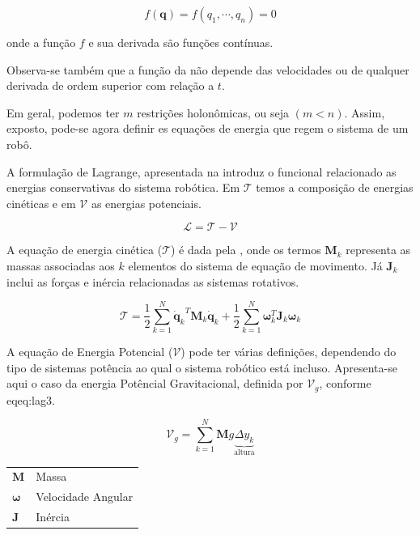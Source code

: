  \begin{equation}
     f(\mathbf{q}) = f(q_1, \cdots, q_n) = 0
     \label{eq:homo}
 \end{equation}

 onde a função $f$ e sua derivada são funções contínuas.

 Observa-se também que a função da  não depende das velocidades ou de qualquer derivada de ordem superior com relação a $t$.

 Em geral, podemos ter $m$ restrições holonômicas, ou seja $(m<n)$. Assim, exposto, pode-se agora definir es equações de energia que regem o sistema de um robô.

A formulação de Lagrange, apresentada na  introduz o funcional relacionado as energias conservativas do sistema robótica. Em $\mathcal{T}$ temos a composição de energias
cinéticas e em $\mathcal{V}$ as energias potenciais.

 \begin{equation}
     \mathcal{L}= \mathcal{T} - \mathcal{V}
     \label{eq:lag1}
 \end{equation}

A equação de energia cinética ($\mathcal{T}$) é dada pela , onde os termos $\mathbf{M}_k$ representa as massas associadas aos $k$ elementos do sistema de equação de movimento. Já $\mathbf{J}_k $ inclui 
as forças e inércia relacionadas as sistemas rotativos.

\begin{equation}
   \mathcal{T} = \frac{1}{2} \sum\limits_{k=1}^{N}{\mathbf{\dot{q}}_k}^T  \mathbf{M}_k {\mathbf{\dot{q}}_k}+ \frac{1}{2} \sum\limits_{k=1}^{N}\mathbf{\omega}_k^T \mathbf{J}_k \mathbf{\omega}_k
   \label{eq:lag2}
\end{equation}

A equação de Energia Potencial ($\mathcal{V}$) pode ter várias definições, dependendo do tipo de sistemas potência ao qual o sistema 
robótico está incluso. Apresenta-se aqui o caso da energia Potêncial Gravitacional, definida por $\mathcal{V}_g$, conforme eq{eq:lag3}.

\begin{equation}
   \mathcal{V}_g = \sum\limits_{k=1}^{N}\mathbf{M}g \underbrace{\Delta y_k}_{\text{altura}}
   \label{eq:lag3}
\end{equation}  

\begin{tabular}{l|l}
    $\mathbf{M}$               & Massa     \\
    $\mathbf{\omega}$ & Velocidade Angular \\
    $\mathbf{J}$               & Inércia   \\
\end{tabular}

